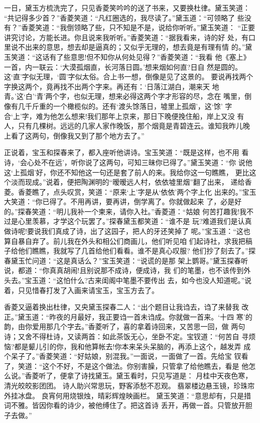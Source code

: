一日，黛玉方梳洗完了，只见香菱笑吟吟的送了书来，又要换杜律。黛玉笑道：
“共记得多少首？”香菱笑道：“凡红圈选的，我尽读了。”黛玉道：“可领略了
些没有？”香菱笑道：“我倒领略了些，只不知是不是，说给你听听。”黛玉笑道：
“正要讲究讨论，方能长进。你且说来我听听。”香菱笑道：“据我看来，诗的好
处，有口里说不出来的意思，想去却是逼真的；又似乎无理的，想去竟是有理有情
的。”黛玉笑道：“这话有了些意思!但不知你从何处见得？”香菱笑道：“我看
他《塞上》一首，内一联云：‘大漠孤烟直，长河落日圆。’想来烟如何直?日自
然是圆的。这‘直’字似无理，‘圆’字似太俗。合上书一想，倒像是见了这景的。
要说再找两个字换这两个，竟再找不出两个字来。再还有：‘日落江湖白，潮来天
地青。’这‘白’‘青’两个字，也似无理，想来必得这两个字才形容的尽，念在
嘴里，倒像有几千斤重的一个橄榄似的。还有‘渡头馀落日，墟里上孤烟’，这‘馀’
字合‘上’字，难为他怎么想来!我们那年上京来，那日下晚便挽住船，岸上又没
有人，只有几棵树。远远的几家人家作晚饭，那个烟竟是青碧连云。谁知我昨儿晚
上看了这两句，倒像我又到了那个地方去了。”

正说着，宝玉和探春来了，都入座听他讲诗。宝玉笑道：“既是这样，也不用
看诗，‘会心处不在远’，听你说了这两句，可知三昧你已得了。”黛玉笑道：“你
说他这‘上孤烟’好，你还不知他这一句还是套了前人的来。我给你这一句瞧瞧，
更比这个淡而现成。”说着，便把陶渊明的“暧暧远人村，依依墟里烟”翻了出来，
递给香菱。香菱瞧了，点头叹赏，笑道：“原来‘上’字是从‘依依’两个字上化
出来的。”宝玉大笑道：“你已得了。不用再讲，要再讲，倒学离了。你就做起来
了，必是好的。”探春笑道：“明儿我补一个柬来，请你入社。”香菱道：“姑娘
何苦打趣我!我不过是心里羡慕，才学这个玩罢了。”探春黛玉都笑道：“谁不是
玩?难道我们是认真做诗呢!要说我们真成了诗，出了这园子，把人的牙还笑掉了
呢。”宝玉道：“这也算自暴自弃了。前儿我在外头和相公们商画儿，他们听见咱
们起诗社，求我把稿子给他们瞧瞧，我就写了几首给他们看看。谁不是真心叹服?
他们抄了刻去了。”探春黛玉忙问道：“这是真话么？”宝玉笑道：“说谎的是那
架上鹦哥。”黛玉探春听说，都道：“你真真胡闹!且别说那不成诗，便成诗，我
们的笔墨，也不该传到外头去。”宝玉道：“这怕什么?古来闺阁中笔墨不要传出
去，如今也没人知道呢。”说着，只见惜春打发了入画来请宝玉，宝玉方去了。

香菱又逼着换出杜律，又央黛玉探春二人：“出个题目让我诌去，诌了来替我
改正。”黛玉道：“昨夜的月最好，我正要诌一首未诌成。你就做一首来。‘十四
寒’的韵，由你爱用那几个字去。”香菱听了，喜的拿着诗回来，又苦思一回，做
两句诗；又舍不得杜诗，又读两首：如此茶饭无心，坐卧不定。宝钗道：“何苦自
寻烦恼?都是颦儿引的你，我和他算帐去!你本来呆头呆脑的，再添上这个，越发弄
成个呆子了。”香菱笑道：“好姑娘，别混我。”一面说，一面做了一首。先给宝
钗看了，笑道：“这个不好，不是这个做法。你别害臊，只管拿了给他瞧去，看是
他怎么说。”香菱听了，便拿了诗找黛玉。黛玉看时，只见写道是：
月桂中天夜色寒，清光皎皎影团团。
诗人助兴常思玩，野客添愁不忍观。
翡翠楼边悬玉镜，珍珠帘外挂冰盘。
良宵何用烧银烛，晴彩辉煌映画栏。
黛玉笑道：“意思却有，只是措词不雅。皆因你看的诗少，被他缚住了。把这首诗
丢开，再做一首。只管放开胆子去做。”

